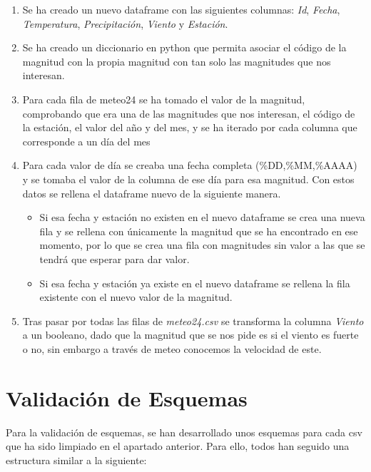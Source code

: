 \documentclass[]{article}
\begin{document}
\begin{enumerate}
    \item Se ha creado un nuevo dataframe con las siguientes columnas: \textit{Id}, \textit{Fecha}, \textit{Temperatura}, \textit{Precipitación}, \textit{Viento} y \textit{Estación}.
    \item Se ha creado un diccionario en python que permita asociar el código de la magnitud con la propia magnitud con tan solo las magnitudes que nos interesan.
    \item Para cada fila de meteo24 se ha tomado el valor de la magnitud, comprobando que era una de las magnitudes que nos interesan, el código de la estación, el valor del año y del mes, y se ha iterado por cada columna que corresponde a un día del mes
    \item Para cada valor de día se creaba una fecha completa (\%DD,\%MM,\%AAAA) y se tomaba el valor de la columna de ese día para esa magnitud. Con estos datos se rellena el dataframe nuevo de la siguiente manera.
    \begin{itemize}
        \item Si esa fecha y estación no existen en el nuevo dataframe se crea una nueva fila y se rellena con únicamente la magnitud que se ha encontrado en ese momento, por lo que se crea una fila con magnitudes sin valor a las que se tendrá que esperar para dar valor.
        \item Si esa fecha y estación ya existe en el nuevo dataframe se rellena la fila existente con el nuevo valor de la magnitud.
    \end{itemize}
    \item Tras pasar por todas las filas de \textit{meteo24.csv} se transforma la columna \textit{Viento} a un booleano, dado que la magnitud que se nos pide es si el viento es fuerte o no, sin embargo a través de meteo conocemos la velocidad de este.
\end{enumerate}

\newpage
\section{Validación de Esquemas}
\label{sec:validacion}
Para la validación de esquemas, se han desarrollado unos esquemas para cada csv que ha sido limpiado en el apartado anterior. Para ello, todos han seguido una estructura similar a la siguiente:
\end{document}
